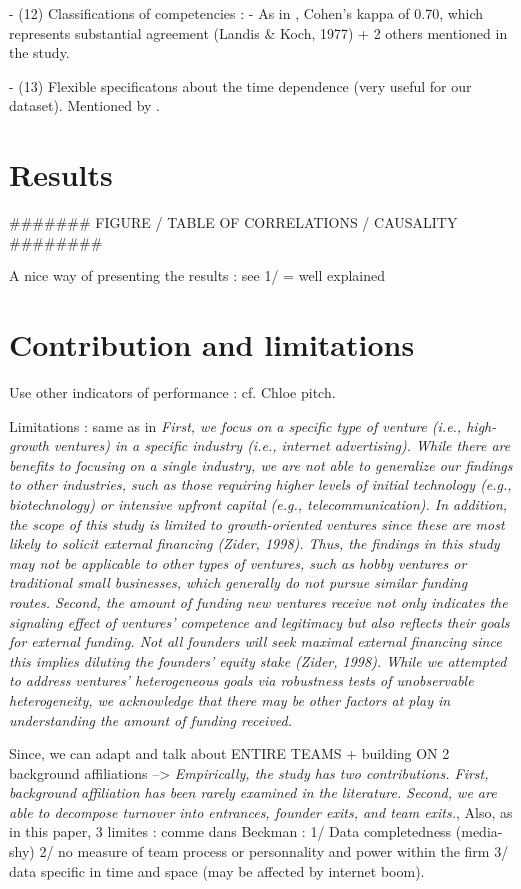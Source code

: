 \begin{itemize}
\begin{itemize}
- (12) Classifications of competencies : - As in \citet{reese2020should}, Cohen's kappa of 0.70, which represents substantial agreement (Landis & Koch, 1977) + 2 others mentioned in the study.

- (13) Flexible specificatons about the time dependence (very useful for our dataset). Mentioned by \citet{grillitsch2020does}.

\section{Results}

####### FIGURE / TABLE OF CORRELATIONS / CAUSALITY ########

A nice way of presenting the results : see 1/ \citet{taylor2006superman} = well explained


\section{Contribution and limitations}

Use other indicators of performance : cf. Chloe pitch.

Limitations : same as in \citep{ko2018signaling} \textit{First, we focus on a specific type of venture (i.e., high-growth ventures) in a specific industry (i.e., internet advertising). While there are benefits to focusing on a single industry, we are not able to generalize our findings to other industries, such as those requiring higher levels of initial technology (e.g., biotechnology) or intensive upfront capital (e.g., telecommunication). In addition, the scope of this study is limited to growth-oriented ventures since these are most likely to solicit external financing (Zider, 1998). Thus, the findings in this study may not be applicable to other types of ventures, such as hobby ventures or traditional small businesses, which generally do not pursue similar funding routes. Second, the amount of funding new ventures receive not only indicates the signaling effect of ventures' competence and legitimacy but also reflects their goals for external funding. Not all founders will seek maximal external financing since this implies diluting the founders' equity stake (Zider, 1998). While we attempted to address ventures' heterogeneous goals via robustness tests of unobservable heterogeneity, we acknowledge that there may be other factors at play in understanding the amount of funding received.}

Since\citet{beckman2007early}, we can adapt and talk about ENTIRE TEAMS + building ON 2 background affiliations --> \textit{Empirically, the study has two contributions. First, background affiliation has been rarely examined in the literature. Second, we are able to decompose turnover into entrances, founder exits, and team exits.}, Also, as in this paper, 3 limites : comme dans Beckman : 1/ Data completedness (media-shy) 2/ no measure of team process or personnality and power within the firm 3/ data specific in time and space (may be affected by internet boom).


\end{itemize}
\end{itemize}
